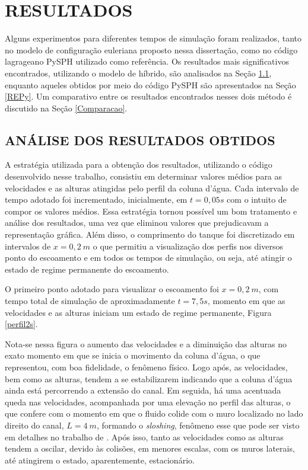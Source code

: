 \chapter{RESULTADOS}
Alguns experimentos para diferentes tempos de simulação foram realizados, tanto no modelo de configuração euleriana proposto nessa dissertação, como no código lagrageano PySPH utilizado como referência. Os resultados mais significativos encontrados, utilizando o modelo de híbrido, são analisados na Seção \ref{Hibri}, enquanto aqueles obtidos por meio do código PySPH são apresentados na Seção \ref{REPy}.  Um comparativo entre os resultados encontrados nesses dois método é discutido na Seção \ref{Comparacao}.  


\section{ANÁLISE DOS RESULTADOS OBTIDOS} \label{Hibri}

 A estratégia utilizada para a obtenção dos resultados, utilizando o código desenvolvido nesse trabalho, consistiu em determinar valores médios para as velocidades e as alturas atingidas pelo perfil da coluna d'água. Cada intervalo de tempo adotado foi incrementado, inicialmente, em $t= 0,05s$ com o intuito de compor os valores médios. Essa estratégia tornou possível um bom tratamento e análise dos resultados, uma vez que eliminou valores que prejudicavam a representação gráfica. Além disso, o comprimento do tanque foi discretizado em intervalos de $x=0,2 \ m$ o que permitiu a visualização dos perfis nos diversos ponto do escoamento e em todos os tempos de simulação, ou seja, até atingir o estado de regime permanente do escoamento.
 
 O primeiro ponto adotado para visualizar o escoamento foi $x= 0,2 \ m$, com tempo total de simulação de aproximadamente $t = 7,5s$, momento em que as velocidades e as alturas iniciam um estado de regime permanente, Figura \ref{perfil2s}.
 
 Nota-se nessa figura o aumento das velocidades e a diminuição das alturas no exato momento em que se inicia o movimento da coluna d'água, o que representou, com boa fidelidade, o fenômeno físico. Logo após, as velocidades, bem como as alturas, tendem a se estabilizarem indicando que a coluna d'água ainda está percorrendo a extensão do canal. Em seguida, há uma acentuada queda nas velocidades, acompanhada por uma elevação no perfil das alturas, o que confere com o momento em que o fluido colide com o muro localizado no lado direito do canal, $L=4 \ m$, formando o \textit{sloshing}, fenômeno esse que pode ser visto em detalhes no trabalho de . Após isso, tanto as velocidades como as alturas tendem a oscilar, devido às colisões, em menores escalas, com os muros laterais, até atingirem o estado, aparentemente, estacionário. 
 
